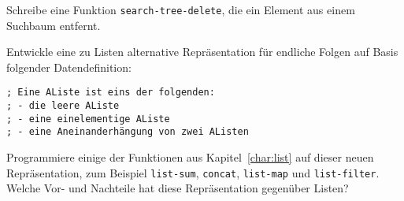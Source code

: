 \begin{aufgabe}
  \label{aufgabe:search-tree-delete}
  Schreibe eine Funktion \texttt{search-tree-delete}, die ein
  Element aus einem Suchbaum entfernt.  
\end{aufgabe}

\begin{aufgabe}
  Entwickle eine zu Listen alternative Repräsentation für endliche
  Folgen auf Basis folgender Datendefinition:
\begin{lstlisting}
; Eine AListe ist eins der folgenden:
; - die leere AListe
; - eine einelementige AListe
; - eine Aneinanderhängung von zwei AListen
\end{lstlisting}
  Programmiere einige der Funktionen aus Kapitel~\ref{char:list} auf
  dieser neuen Repräsentation, zum Beispiel \lstinline{list-sum},
  \lstinline{concat}, \lstinline{list-map} und
  \lstinline{list-filter}.  Welche Vor- und Nachteile hat diese
  Repräsentation gegenüber Listen?
\end{aufgabe}

